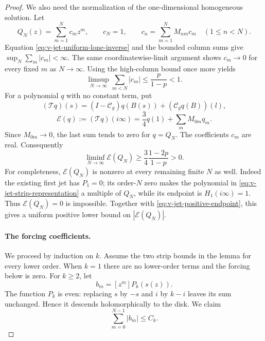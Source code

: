 \begin{proof}
We also need the normalization of the one-dimensional homogeneous
solution.  Let
\[
 Q_N(z)=\sum_{m=1}^N c_mz^m,\qquad c_N=1,\qquad
 c_n=\sum_{m=1}^N M_{nm}c_m\quad(1\le n<N).
\]
Equation \eqref{eq:v-jet-uniform-lone-inverse} and the bounded column
sums give $\sup_N\sum_m|c_m|<\infty$.  The same coordinatewise-limit
argument shows $c_m\to0$ for every fixed $m$ as $N\to\infty$.  Using
the high-column bound once more yields
\begin{equation}\label{eq:v-jet-homogeneous-lower-coefficients}
 \limsup_{N\to\infty}\sum_{m<N}|c_m|
       \le\frac p{1-p}<1.
\end{equation}
For a polynomial $q$ with no constant term, put
\[
 (\mathcal Tq)(s)=(I-\mathcal C_g  )q(B(s))
                         +(\mathcal C_g  q(B))( l),
\]
\begin{equation}\label{eq:v-jet-normalization-functional}
 \mathcal E(q):=(\mathcal Tq)(i\infty)
       =\frac34q(1)+\sum_mM_{0m}q_m.
\end{equation}
Since $M_{0m}\to0$, the last sum tends to zero for $q=Q_N$.
The coefficients $c_m$ are real.  Consequently
\begin{equation}\label{eq:v-jet-positive-endpoint}
 \liminf_{N\to\infty}\mathcal E(Q_N)
       \ge\frac34\frac{1-2p}{1-p}>0.
\end{equation}
For completeness, $\mathcal E(Q_N)$ is nonzero at every remaining
finite $N$ as well.  Indeed the existing first jet has $P_1=0$;
its order-$N$ zero makes the polynomial in
\eqref{eq:v-jet-strip-representation} a multiple of $Q_N$, while its
endpoint is $H_1(i\infty)=1$.  Thus $\mathcal E(Q_N)=0$ is impossible.
Together with \eqref{eq:v-jet-positive-endpoint}, this gives a uniform
positive lower bound on $|\mathcal E(Q_N)|$.

\paragraph{The forcing coefficients.}
We proceed by induction on $k$.  Assume the two strip bounds in the
lemma for every lower order.  When $k=1$ there are no lower-order
terms and the forcing below is zero.  For $k\ge2$, let
\[
 b_m=[z^m]P_k(s(z)).
\]
The function $P_k$ is even: replacing $s$ by $-s$ and $i$ by $k-i$
leaves its sum unchanged.  Hence it descends holomorphically to the
disk.  We claim
\begin{equation}\label{eq:v-jet-forcing-lone}
 \sum_{m=0}^{N-1}|b_m|\le C_k.
\end{equation}


\end{proof}
